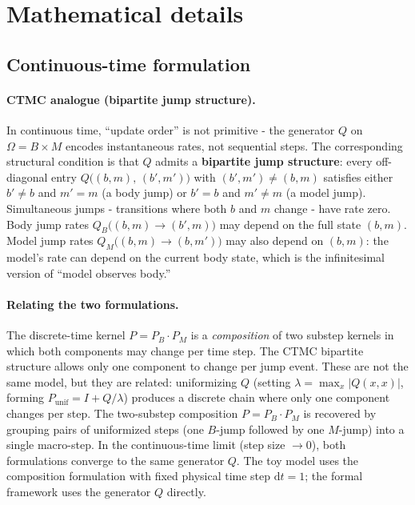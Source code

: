 \documentclass[12pt]{article}
\theoremstyle{remark}
\begin{document}
\section{Mathematical details}\label{app:math}

\subsection{Continuous-time formulation}\label{app:ctmc}

\paragraph{CTMC analogue (bipartite jump structure).}
In continuous time, ``update order'' is not primitive - the generator $Q$ on $\Omega = B \times M$ encodes instantaneous rates, not sequential steps. The corresponding structural condition is that $Q$ admits a \textbf{bipartite jump structure}: every off-diagonal entry $Q\bigl((b,m),\,(b',m')\bigr)$ with $(b',m') \neq (b,m)$ satisfies either $b' \neq b$ and $m' = m$ (a body jump) or $b' = b$ and $m' \neq m$ (a model jump). Simultaneous jumps - transitions where both $b$ and $m$ change - have rate zero. Body jump rates $Q_B\bigl((b,m) \to (b',m)\bigr)$ may depend on the full state $(b,m)$. Model jump rates $Q_M\bigl((b,m) \to (b,m')\bigr)$ may also depend on $(b,m)$: the model's rate can depend on the current body state, which is the infinitesimal version of ``model observes body.''

\paragraph{Relating the two formulations.} The discrete-time kernel $P = P_B \cdot P_M$ is a \emph{composition} of two substep kernels in which both components may change per time step. The CTMC bipartite structure allows only one component to change per jump event. These are not the same model, but they are related: uniformizing $Q$ (setting $\lambda = \max_x |Q(x,x)|$, forming $P_{\mathrm{unif}} = I + Q/\lambda$) produces a discrete chain where only one component changes per step. The two-substep composition $P = P_B \cdot P_M$ is recovered by grouping pairs of uniformized steps (one $B$-jump followed by one $M$-jump) into a single macro-step. In the continuous-time limit (step size $\to 0$), both formulations converge to the same generator $Q$. The toy model uses the composition formulation with fixed physical time step $\mathrm{d}t = 1$; the formal framework uses the generator $Q$ directly.
\end{document}
